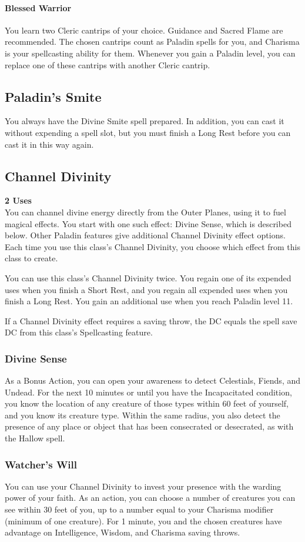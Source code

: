 \documentclass[letterpaper,openany,oneside,twocolumn]{book}
\begin{document}
\paragraph*{Blessed Warrior} You learn two Cleric cantrips of your choice. Guidance and Sacred Flame are recommended. The chosen cantrips count as Paladin spells for you, and Charisma is your spellcasting ability for them. Whenever you gain a Paladin level, you can replace one of these cantrips with another Cleric cantrip.
\subsection*{Paladin's Smite}
You always have the Divine Smite spell prepared. In addition, you can cast it without expending a spell slot, but you must finish a Long Rest before you can cast it in this way again.
\subsection*{Channel Divinity}
\textbf{2 Uses}\\
You can channel divine energy directly from the Outer Planes, using it to fuel magical effects. You start with one such effect: Divine Sense, which is described below. Other Paladin features give additional Channel Divinity effect options. Each time you use this class's Channel Divinity, you choose which effect from this class to create.

You can use this class's Channel Divinity twice. You regain one of its expended uses when you finish a Short Rest, and you regain all expended uses when you finish a Long Rest. You gain an additional use when you reach Paladin level 11.

If a Channel Divinity effect requires a saving throw, the DC equals the spell save DC from this class's Spellcasting feature.
\subsubsection*{Divine Sense}
As a Bonus Action, you can open your awareness to detect Celestials, Fiends, and Undead. For the next 10 minutes or until you have the Incapacitated condition, you know the location of any creature of those types within 60 feet of yourself, and you know its creature type. Within the same radius, you also detect the presence of any place or object that has been consecrated or desecrated, as with the Hallow spell.
\subsubsection*{Watcher's Will}
You can use your Channel Divinity to invest your presence with the warding power of your faith. As an action, you can choose a number of creatures you can see within 30 feet of you, up to a number equal to your Charisma modifier (minimum of one creature). For 1 minute, you and the chosen creatures have advantage on Intelligence, Wisdom, and Charisma saving throws.
\end{document}
